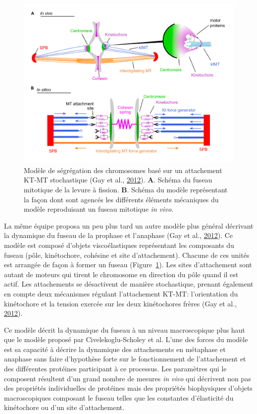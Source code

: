 \documentclass[12pt,a4paper,twoside,openright]{book}
\begin{document}
\begin{figure}[htbp]
\centering
\includegraphics{figures/intro/gay.png}
\caption[Modèle de ségrégation des chromosomes]{\label{fig:gay}Modèle de
ségrégation des chromosomes basé sur un attachement KT-MT stochastique
(Gay et al., \protect\hyperlink{ref-Gay2012a}{2012}). \textbf{A}. Schéma
du fuseau mitotique de la levure à fission. \textbf{B}. Schéma du modèle
représentant la façon dont sont agencés les différents éléments
mécaniques du modèle reproduisant un fuseau mitotique \emph{in vivo}.}
\end{figure}

La même équipe proposa un peu plus tard un autre modèle plus général
décrivant la dynamique du fuseau de la prophase et l'anaphase (Gay et
al., \protect\hyperlink{ref-Gay2012a}{2012}). Ce modèle est composé
d'objets viscoélastiques représentant les composants du fuseau (pôle,
kinétochore, cohésine et site d'attachement). Chacune de ces unités est
arrangée de façon à former un fuseau (Figure~\ref{fig:gay}). Les sites
d'attachement sont autant de moteurs qui tirent le chromosome en
direction du pôle quand il est actif. Les attachements se désactivent de
manière stochastique, prenant également en compte deux mécanismes
régulant l'attachement KT-MT: l'orientation du kinétochore et la tension
exercée sur les deux kinétochores frères (Gay et al.,
\protect\hyperlink{ref-Gay2012a}{2012}).

Ce modèle décrit la dynamique du fuseau à un niveau macroscopique plus
haut que le modèle proposé par Civelekoglu-Scholey et al. L'une des
forces du modèle est sa capacité à décrire la dynamique des attachements
en métaphase et anaphase sans faire d'hypothèse forte sur le
fonctionnement de l'attachement et des différentes protéines participant
à ce processus. Les paramètres qui le composent résultent d'un grand
nombre de mesures \emph{in vivo} qui décrivent non pas des propriétés
individuelles de protéines mais des propriétés biophysiques d'objets
macroscopiques composant le fuseau telles que les constantes
d'élasticité du kinétochore ou d'un site d'attachement.
\end{document}
